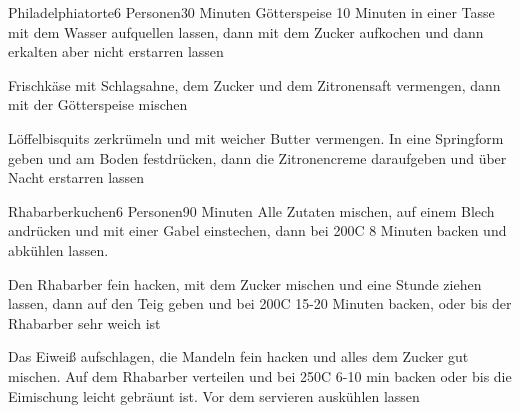 
\begin{recipe}{Philadelphiatorte}{6 Personen}{30 Minuten}
Götterspeise 10 Minuten in einer Tasse mit dem Wasser aufquellen lassen, dann mit dem Zucker aufkochen und dann erkalten aber nicht erstarren lassen

Frischkäse mit Schlagsahne, dem Zucker und dem Zitronensaft vermengen, dann mit der Götterspeise mischen

Löffelbisquits zerkrümeln und mit weicher Butter vermengen.
In eine Springform geben und am Boden festdrücken, dann die Zitronencreme daraufgeben und über Nacht erstarren lassen
\end{recipe}


\begin{recipe}{Rhabarberkuchen}{6 Personen}{90 Minuten}
Alle Zutaten mischen, auf einem Blech andrücken und mit einer Gabel einstechen, dann bei 200\0C 8 Minuten backen und abkühlen lassen.

Den Rhabarber fein hacken, mit dem Zucker mischen und eine Stunde ziehen lassen, dann auf den Teig geben und bei 200\0C 15-20 Minuten backen, oder bis der Rhabarber sehr weich ist

Das Eiweiß aufschlagen, die Mandeln fein hacken und alles dem Zucker gut mischen.
Auf dem Rhabarber verteilen und bei 250\0C 6-10 min backen oder bis die Eimischung leicht gebräunt ist.
Vor dem servieren auskühlen lassen
\end{recipe}


